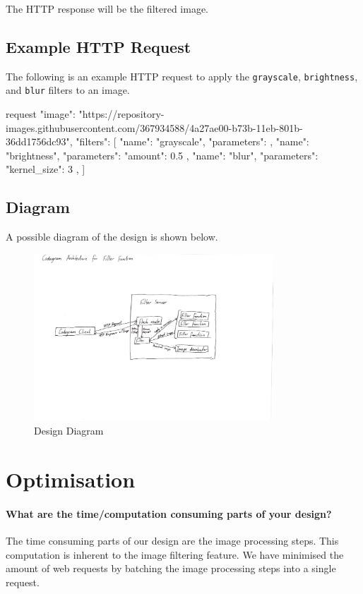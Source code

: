 \documentclass{csse4400}
\begin{document}
The HTTP response will be the filtered image.

\subsection{Example HTTP Request}

The following is an example HTTP request to apply the \texttt{grayscale}, \texttt{brightness}, and \texttt{blur} filters to an image.

\begin{code}[language=json]{request}
{
  "image": "https://repository-images.githubusercontent.com/367934588/4a27ae00-b73b-11eb-801b-36dd1756dc93",
  "filters": [
    {
      "name": "grayscale",
      "parameters": {}
    },
    {
      "name": "brightness",
      "parameters": {
        "amount": 0.5
      }
    },
    {
      "name": "blur",
      "parameters": {
        "kernel_size": 3
      }
    },
  ]
}
\end{code}

\subsection{Diagram}

A possible diagram of the design is shown below.

\begin{figure}[h]
    \centering
    \includegraphics[width=0.8\textwidth]{diagram.pdf}
    \caption{Design Diagram}
    \label{fig:diagram}
\end{figure}

\section{Optimisation}

\paragraph{What are the time/computation consuming parts of your design?}
The time consuming parts of our design are the image processing steps.
This computation is inherent to the image filtering feature.
We have minimised the amount of web requests by batching the image processing steps into a single request.
\end{document}
